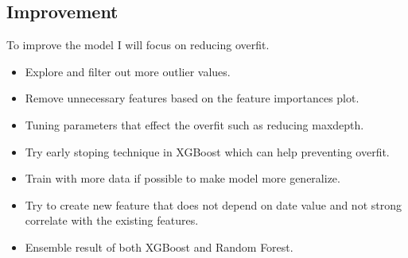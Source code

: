 \documentclass[11pt]{article}
\begin{document}
\subsection{Improvement}\label{improvement}

To improve the model I will focus on reducing overfit.

\begin{itemize}
\itemsep1pt\parskip0pt
\item
  Explore and filter out more outlier values.
\item
  Remove unnecessary features based on the feature importances plot.
\item
  Tuning parameters that effect the overfit such as reducing maxdepth.
\item
  Try early stoping technique in XGBoost which can help preventing
  overfit.
\item
  Train with more data if possible to make model more generalize.
\item
  Try to create new feature that does not depend on date value and not
  strong correlate with the existing features.
\item
  Ensemble result of both XGBoost and Random Forest.
\end{itemize}


    
    
    
    
\end{document}
